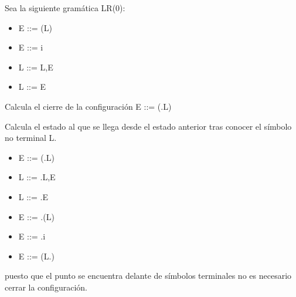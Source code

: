 \begin{problem}
Sea la siguiente gramática LR(0):
\begin{itemize}
\item E ::= (L)
\item E ::= i
\item L ::= L,E
\item L ::= E
\end{itemize}

\ppart Calcula el cierre de la configuración E ::= (.L)

\ppart Calcula el estado al que se llega desde el estado anterior tras conocer el símbolo no terminal L.
\solution
\ppart
\begin{itemize}
\item E ::= (.L)
\item L ::= .L,E
\item L ::= .E
\item E ::= .(L)
\item E ::= .i
\end{itemize}

\ppart
\begin{itemize}
\item E ::= (L.)
\end{itemize}
puesto que el punto se encuentra delante de símbolos terminales no es necesario cerrar la configuración.
\end{problem}

